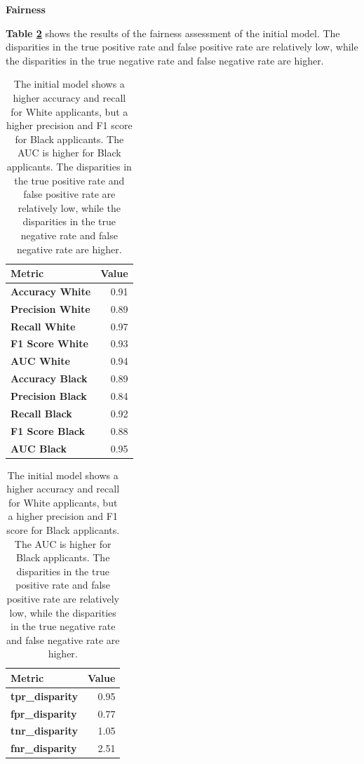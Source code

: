 \textbf{Fairness}

\textbf{Table \ref{tab:initial_model_fairness_results_1}} shows the results of the fairness assessment of the initial model. The disparities in the true positive rate and false positive rate are relatively low, while the disparities in the true negative rate and false negative rate are higher.

\begin{table}[h]
    \caption{Metrics \#2: Initial Model}
    \begin{minipage}[t]{0.5\textwidth}
    \centering
    \begin{tabular}{lr}
    \toprule
    \textbf{Metric} & \textbf{Value} \\
    \midrule
    \textbf{Accuracy White} & 0.91 \\
    \textbf{Precision White} & 0.89 \\
    \textbf{Recall White} & 0.97 \\
    \textbf{F1 Score White} & 0.93 \\
    \textbf{AUC White} & 0.94 \\
    \textbf{Accuracy Black} & 0.89 \\
    \textbf{Precision Black} & 0.84 \\
    \textbf{Recall Black} & 0.92 \\
    \textbf{F1 Score Black} & 0.88 \\
    \textbf{AUC Black} & 0.95 \\
    \bottomrule
    \end{tabular}
    \end{minipage}\hfill
    \begin{minipage}[t]{0.5\textwidth}
    \centering
    \begin{tabular}{lr}
    \toprule
    \textbf{Metric} & \textbf{Value} \\
    \midrule
    \textbf{tpr\_disparity} & 0.95 \\
    \textbf{fpr\_disparity} & 0.77 \\
    \textbf{tnr\_disparity} & 1.05 \\
    \textbf{fnr\_disparity} & 2.51 \\
    \bottomrule
    \end{tabular}
    \end{minipage}
    \label{tab:initial_model_fairness_results_1}
    \caption*{The initial model shows a higher accuracy and recall for White applicants, but a higher precision and F1 score for Black applicants. The AUC is higher for Black applicants. The disparities in the true positive rate and false positive rate are relatively low, while the disparities in the true negative rate and false negative rate are higher.}
\end{table}


